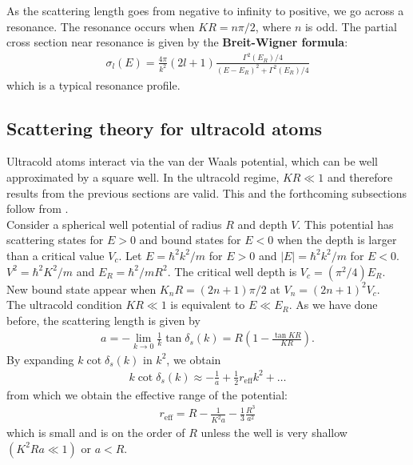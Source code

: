 \documentclass{book}
\theoremstyle{definition}
\newcommand{\f}[2]{\frac{#1}{#2}}
\newcommand{\lp}{\left(}
\newcommand{\rp}{\right)}
\begin{document}
\begin{framed}
	As the scattering length goes from negative to infinity to positive, we go across a resonance. The resonance occurs when $KR = n \pi/2$, where $n$ is odd. The partial cross section near resonance is given by the \textbf{Breit-Wigner formula}:
	\begin{align*}
		\sigma_l(E) = \f{4\pi}{k^2}(2l+1) \f{\Gamma^2(E_R)/4}{(E-E_R)^2 + \Gamma^2(E_R)/4}
	\end{align*}
	which is a typical  resonance profile.
\end{framed}


\subsection{Scattering theory for ultracold atoms}

Ultracold atoms interact via the van der Waals potential, which can be well approximated by a square well. In the ultracold regime, $KR \ll 1$ and therefore results from the previous sections are valid. This and the forthcoming subsections follow from \cite{ketterle2008making}.\\

Consider a spherical well potential of radius $R$ and depth $V$. This potential has scattering states for $E>0$ and bound states for $E<0$ when the depth is larger than a critical value $V_c$. Let $E = \hbar^2k^2/m$ for $E>0$ and $|E| = \hbar^2 k^2/m$ for $E<0$. $V^2 = \hbar^2 K^2/m$ and $E_R = \hbar^2 /mR^2$. The critical well depth is $V_c = (\pi^2/4) E_R$. New bound state appear when $K_n R = (2n+1)\pi/2$ at $V_n = (2n+1)^2 V_c$.\\

The ultracold condition $KR \ll 1$ is equivalent to $E \ll E_R$. As we have done before, the scattering length is given by 
\begin{align*}
	a = -\lim_{k\to 0} \f{1}{k} \tan \delta_s(k) = R \lp 1 - \f{\tan KR}{KR} \rp.
\end{align*}
By expanding  $k\cot \delta_s(k)$ in $k^2$, we obtain 
\begin{align*}
	k\cot \delta_s(k) \approx -\f{1}{a} + \f{1}{2}r_\text{eff} k^2 + \dots
\end{align*}
from which we obtain the effective range of the potential:
\begin{align*}
	r_\text{eff} = R - \f{1}{K^2a } - \f{1}{3} \f{R^3}{a^2}
\end{align*}
which is small and is on the order of $R$ unless the well is very shallow $(K^2 Ra \ll 1)$ or $a < R$.\\
\end{document}
